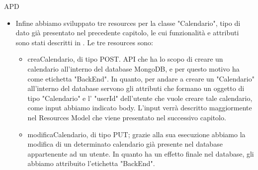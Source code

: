 \begin{listaPersonale} {APD}
\begin{listaPersonale2}[APD]{}
\begin{itemize}
\begin{itemize}
                      \item modificaEvento, di tipo PUT; grazie alla sua esecuzione abbiamo la modifica di un determinato evento già presente nel database appartenente ad un utente. In quanto ha un effetto finale nel database, gli abbiamo attribuito l'etichetta "BackEnd".
                      \item eliminaEvento, di tipo DELETE. Lo scopo di questa resource è quello di dare la possibilità di eliminare un "Evento" dato il suo "IDEvento" e l'"userId" dell'utente autenticato che ha questo determinato "Evento" che vuole eliminare. In quanto ha un effetto finale nel database, gli abbiamo attribuito l'etichetta "BackEnd".
                      \item getEventi, di tipo GET. Risorsa mediante cui si ottengo gli eventi di un calendario, dato l'"userId" dell'utente che ha tale calendario e l' "IDCalendario" del calendario da cui vogliamo estrarre gli eventi. L'etichetta "FrontEnd" è stata messa in quanto questa API è fondamentale per mostrare all'utente finale nell'user interface gli eventi di un determinato calendario.
                  \end{itemize}
                  Si specifica che tutte le resources individuate riguardano a funzioni già presentate in .
            \item Infine abbiamo sviluppato tre resources per la classe "Calendario", tipo di dato già presentato nel precedente capitolo, le cui funzionalità e attributi sono stati descritti in . Le tre resources sono:
                  \begin{itemize}
                      \item creaCalendario, di tipo POST. API che ha lo scopo di creare un calendario all'interno del database MongoDB, e per questo motivo ha come etichetta "BackEnd". In quanto, per andare a creare un "Calendario" all'interno del database servono gli attributi che formano un oggetto di tipo "Calendario" e l' "userId" dell'utente che vuole creare tale calendario, come input abbiamo indicato body. L'input verrà descritto maggiormente nel Resources Model che viene presentato nel successivo capitolo.
                      \item modificaCalendario, di tipo PUT; grazie alla sua esecuzione abbiamo la modifica di un determinato calendario già presente nel database appartenente ad un utente. In quanto ha un effetto finale nel database, gli abbiamo attribuito l'etichetta "BackEnd".

\end{itemize}
\end{itemize}
\end{listaPersonale2}
\end{listaPersonale}
